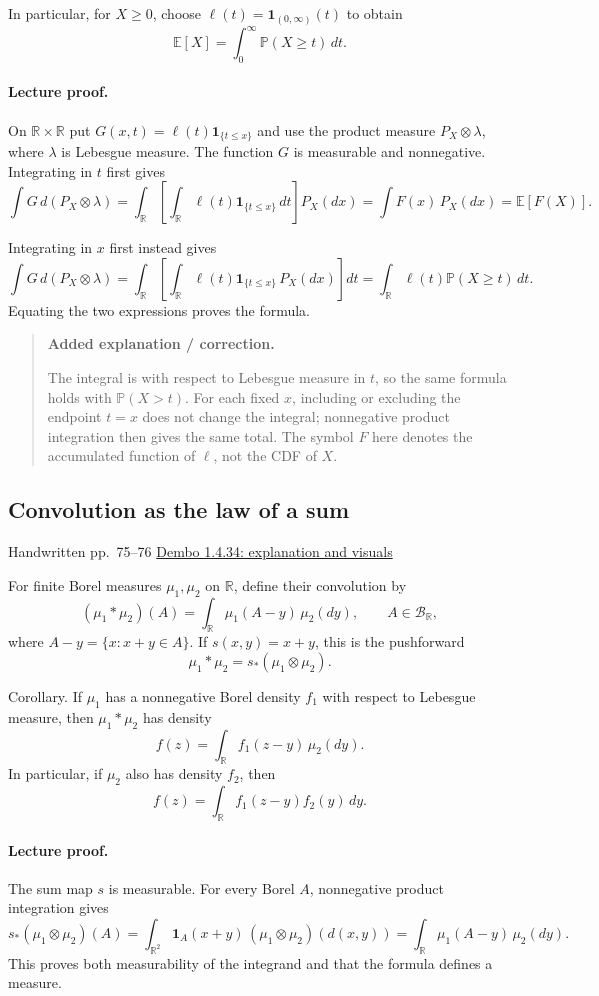 \documentclass[11pt,letterpaper]{article}
\newcommand{\lecturesection}[1]{\subsection{#1}}
\begin{document}
In particular, for $X\ge0$, choose $\ell(t)=\mathbf{1}_{(0,\infty)}(t)$ to obtain \[\mathbb E[X]=\int_0^{\infty}\mathbb P(X\ge t)\,dt.\]

\paragraph{Lecture proof.}
On $\mathbb R\times\mathbb R$ put $G(x,t)=\ell(t)\mathbf{1}_{\{t\le x\}}$ and use the product measure $P_X\otimes\lambda$, where $\lambda$ is Lebesgue measure. The function $G$ is measurable and nonnegative. Integrating in $t$ first gives \[\int G\,d(P_X\otimes\lambda)=\int_{\mathbb R}\left[\int_{\mathbb R}\ell(t)\mathbf{1}_{\{t\le x\}}\,dt\right]P_X(dx)=\int F(x)\,P_X(dx)=\mathbb E[F(X)].\]

Integrating in $x$ first instead gives \[\int G\,d(P_X\otimes\lambda)=\int_{\mathbb R}\left[\int_{\mathbb R}\ell(t)\mathbf{1}_{\{t\le x\}}\,P_X(dx)\right]dt=\int_{\mathbb R}\ell(t)\mathbb P(X\ge t)\,dt.\] Equating the two expressions proves the formula.

\begin{quote}\small\textbf{Added explanation / correction.}

The integral is with respect to Lebesgue measure in $t$, so the same formula holds with $\mathbb P(X>t)$. For each fixed $x$, including or excluding the endpoint $t=x$ does not change the integral; nonnegative product integration then gives the same total. The symbol $F$ here denotes the accumulated function of $\ell$, not the CDF of $X$.
\end{quote}

\hypertarget{l8-s12}{}
\lecturesection{Convolution as the law of a sum}
{\small\textcolor{lectureink}{Handwritten pp.\ 75--76} \quad \href{https://josephrbailey.com/probability/\#entry-1-4-34}{Dembo 1.4.34: explanation and visuals}}

For finite Borel measures $\mu_1,\mu_2$ on $\mathbb R$, define their convolution by \[ (\mu_1*\mu_2)(A)=\int_{\mathbb R}\mu_1(A-y)\,\mu_2(dy),\qquad A\in\mathcal B_{\mathbb R},\] where $A-y=\{x:x+y\in A\}$. If $s(x,y)=x+y$, this is the pushforward \[\mu_1*\mu_2=s_*(\mu_1\otimes\mu_2).\]

Corollary. If $\mu_1$ has a nonnegative Borel density $f_1$ with respect to Lebesgue measure, then $\mu_1*\mu_2$ has density \[f(z)=\int_{\mathbb R}f_1(z-y)\,\mu_2(dy).\] In particular, if $\mu_2$ also has density $f_2$, then \[f(z)=\int_{\mathbb R}f_1(z-y)f_2(y)\,dy.\]

\paragraph{Lecture proof.}
The sum map $s$ is measurable. For every Borel $A$, nonnegative product integration gives \[s_*(\mu_1\otimes\mu_2)(A)=\int_{\mathbb R^2}\mathbf{1}_A(x+y)\,(\mu_1\otimes\mu_2)(d(x,y))=\int_{\mathbb R}\mu_1(A-y)\,\mu_2(dy).\] This proves both measurability of the integrand and that the formula defines a measure.
\end{document}
